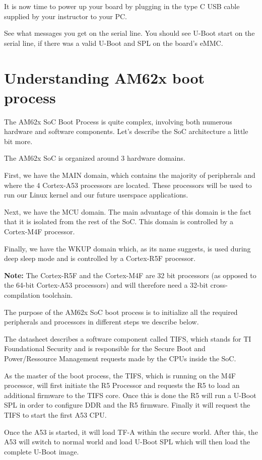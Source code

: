 It is now time to power up your board by plugging in the type C USB
cable supplied by your instructor to your PC.

See what messages you get on the serial line. You should see U-Boot
start on the serial line, if there was a valid U-Boot and SPL on the
board's eMMC.

\section{Understanding AM62x boot process}

The AM62x SoC Boot Process is quite complex, involving both numerous
hardware and software components.
Let's describe the SoC architecture a little bit more.

The AM62x SoC is organized around 3 hardware domains.

First, we have the MAIN domain, which contains the majority of peripherals and
where the 4 Cortex-A53 processors are located. These processors will be used to
run our Linux kernel and our future userspace applications.

Next, we have the MCU domain. The main advantage of this domain is the
fact that it is isolated from the rest of the SoC. This domain is
controlled by a Cortex-M4F processor.

Finally, we have the WKUP domain which, as its name suggests, is used during
deep sleep mode and is controlled by a Cortex-R5F processor.

\textbf{Note:} The Cortex-R5F and the Cortex-M4F are 32 bit processors
(as opposed to the 64-bit Cortex-A53 processors) and will therefore need
a 32-bit cross-compilation toolchain.

The purpose of the AM62x SoC boot process is to initialize all the required
peripherals and processors in different steps we describe below.

The datasheet describes a software component called TIFS, which stands for
TI Foundational Security and is responsible for the Secure
Boot and Power/Ressource Management requests made by the CPUs inside the SoC.

As the master of the boot process, the TIFS, which is running on the
M4F processor, will first initiate the R5 Processor and requests the
R5 to load an additional firmware to the TIFS core. Once this is done the
R5 will run a U-Boot SPL in order to configure DDR and the R5
firmware. Finally it will request the TIFS to start the first A53 CPU.

Once the A53 is started, it will load TF-A within the secure world.
After this, the A53 will switch to normal world and load U-Boot SPL which
will then load the complete U-Boot image.

